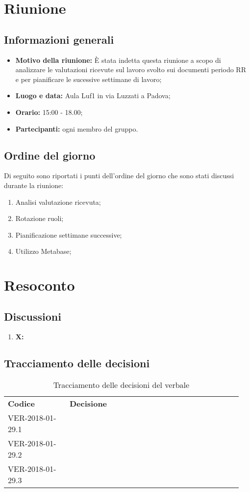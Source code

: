 \documentclass[VER-2018-01-29.tex]{subfiles}
\begin{document}
\chapter{Riunione}

\section{Informazioni generali}	
\begin{itemize}
	\item \textbf{Motivo della riunione:} \`{E} stata indetta questa riunione a scopo di analizzare le valutazioni ricevute sul lavoro svolto sui documenti periodo RR e per pianificare le sucessive settimane di lavoro;
	\item \textbf{Luogo e data:} Aula Luf1 in via Luzzati a Padova;
	\item \textbf{Orario:} 15:00 - 18.00;
	\item \textbf{Partecipanti:} ogni membro del gruppo.
\end{itemize}

\section{Ordine del giorno}	
Di seguito sono riportati i punti dell'ordine del giorno che sono stati discussi durante la riunione:
\begin{enumerate}
	\item Analisi valutazione ricevuta;
	\item Rotazione ruoli;
	\item Pianificazione settimane successive;
	\item Utilizzo Metabase;
\end{enumerate}
\chapter{Resoconto}

\section{Discussioni}
\begin{enumerate}
	\item \textbf{X:} 
\end{enumerate} 

\section{Tracciamento delle decisioni}
\begin{table}[H]
	\begin{center}
		\begin{tabu} to 
			\tableHeaderStyle
			\textbf{Codice} & \textbf{Decisione} \\
			VER-2018-01-29.1 &  \\
			VER-2018-01-29.2 &  \\
			VER-2018-01-29.3 &  \\
		\end{tabu}
		\caption{Tracciamento delle decisioni del verbale}
	\end{center}
\end{table}
\end{document}
